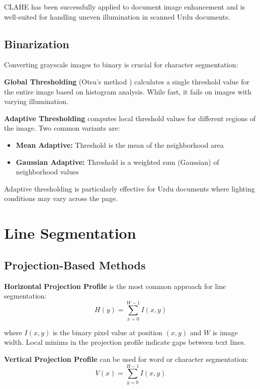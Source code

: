 \documentclass[12pt,a4paper,oneside]{report}
\begin{document}
CLAHE has been successfully applied to document image enhancement \cite{reza2004realization} and is well-suited for handling uneven illumination in scanned Urdu documents.

\subsection{Binarization}

Converting grayscale images to binary is crucial for character segmentation:

\textbf{Global Thresholding} (Otsu's method \cite{otsu1979threshold}) calculates a single threshold value for the entire image based on histogram analysis. While fast, it fails on images with varying illumination.

\textbf{Adaptive Thresholding} computes local threshold values for different regions of the image. Two common variants are:
\begin{itemize}
    \item \textbf{Mean Adaptive:} Threshold is the mean of the neighborhood area
    \item \textbf{Gaussian Adaptive:} Threshold is a weighted sum (Gaussian) of neighborhood values
\end{itemize}

Adaptive thresholding is particularly effective for Urdu documents where lighting conditions may vary across the page.

\section{Line Segmentation}

\subsection{Projection-Based Methods}

\textbf{Horizontal Projection Profile} \cite{likforman1982reading} is the most common approach for line segmentation:
\begin{equation}
H(y) = \sum_{x=0}^{W-1} I(x, y)
\end{equation}

where $I(x, y)$ is the binary pixel value at position $(x, y)$ and $W$ is image width. Local minima in the projection profile indicate gaps between text lines.

\textbf{Vertical Projection Profile} can be used for word or character segmentation:
\begin{equation}
V(x) = \sum_{y=0}^{H-1} I(x, y)
\end{equation}
\end{document}
